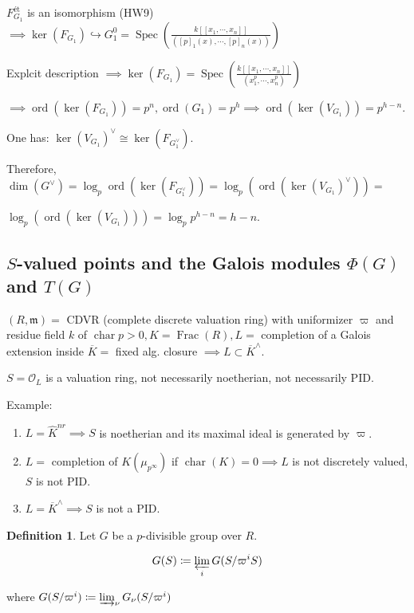 \documentclass{article}
\theoremstyle{definition}
\newtheorem*{definition}{Definition}
\numberwithin{theorem}{subsection}
\begin{document}
    \(F_{G_1}^{\text{\'et}}\) is an isomorphism (HW9) \(\implies \ker(F_{G_1}) \hookrightarrow G_1^0 = \operatorname{Spec}\left( \frac{k[[x_1, \cdots , x_n]]}{\left( [p]_1(x), \cdots , [p]_n(x) \right) } \right) \)  

    Explcit description \(\implies \ker (F_{G_1}) = \operatorname{Spec} \left( \frac{k[[x_1, \cdots , x_n]]}{(x_1^p, \cdots , x_n^p)} \right)\)

    \(\implies \operatorname{ord}(\ker (F_{G_1}))=p^n, \operatorname{ord} (G_1)=p^h \implies \operatorname{ord} (\ker(V_{G_1})) = p^{h-n}\).

    One has: \(\ker (V_{G_1})^\vee \cong \ker (F_{G_1^\vee})\).

    Therefore, \(\dim (G^\vee) = \log_p \operatorname{ord}(\ker(F_{G_1^\vee})) = \log_p (\operatorname{ord}(\ker(V_{G_1})^\vee)) =\)
    
    \( \log_p(\operatorname{ord}(\ker(V_{G_1}))) = \log_p p^{h-n} = h-n\).

    \subsection{\(S\)-valued points and the Galois modules \(\Phi(G)\) and \(T(G)\)}

    \((R,\mathfrak{m}) =\) CDVR (complete discrete valuation ring) with uniformizer \(\varpi\) and residue field \(k\) of \(\operatorname{char} p > 0, K = \operatorname{Frac}(R), L =\) completion of a Galois extension inside \(\overline{K} =\) fixed alg. closure \(\implies L \subset \overline{K}^\wedge\).
    
    \(S = \mathcal{O}_L\) is a valuation ring, not necessarily noetherian, not necessarily PID.

    Example:

    \begin{enumerate}[label=\arabic*)]
        \item \(L = \widehat{K}^{nr} \implies S\) is noetherian and its maximal ideal is generated by \(\varpi\).
        
        \item \(L =\) completion of \(K(\mu_{p^{\infty}})\) if \(\operatorname{char} (K) = 0 \implies L\) is not discretely valued, \(S\) is not PID.
        
        \item \(L = \overline{K}^\wedge \implies S\) is not a PID.
    \end{enumerate} 

    \begin{definition}
        Let \(G\) be a \(p\)-divisible group over \(R\).

        \[
            G(S) \coloneqq \varprojlim_i G(S / \varpi^i S)
        \]

        where \(G(S / \varpi^i) \coloneqq \varinjlim_\nu G_\nu(S / \varpi^i)\) 
    \end{definition}
\end{document}
